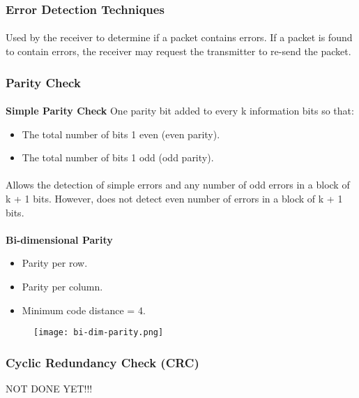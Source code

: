 \documentclass[../resumosRCOM.tex]{subfiles}
\begin{document}
\subsubsection{Error Detection Techniques}
\paragraph{}
Used by the receiver to determine if a packet contains errors. If a packet is 
found to contain errors, the receiver may request the transmitter to re-send 
the packet.

\subsubsection{Parity Check}

\paragraph{}
\textbf{Simple Parity Check}
One parity bit added to every k information bits so that:
\begin{itemize}
    \item The total number of bits 1 even (even parity).
    \item The total number of bits 1 odd (odd parity).
\end{itemize}
\paragraph{}
Allows the detection of simple errors and any number of odd errors in a block of 
k + 1 bits. However, does not detect even number of errors in a block of k + 1 bits.

\paragraph{}
\textbf{Bi-dimensional Parity}
\begin{itemize}
    \item Parity per row.
    \item Parity per column.
    \item Minimum code distance = 4.
\end{itemize}

\begin{figure}[H]
    \centering
    \texttt{[image: bi-dim-parity.png]}
\end{figure}


\subsubsection{Cyclic Redundancy Check (CRC)}
NOT DONE YET!!!
\end{document}
